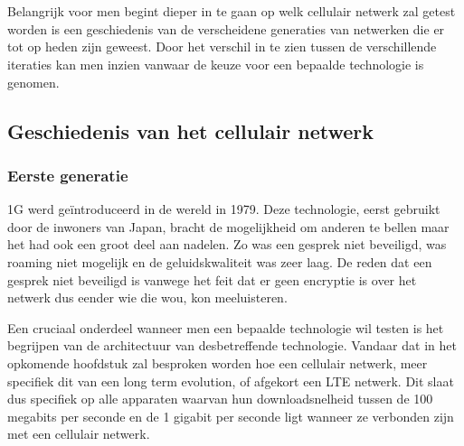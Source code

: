 \chapter{}%
\label{ch:stand-van-zaken}



Belangrijk voor men begint dieper in te gaan op welk cellulair netwerk zal getest worden is een geschiedenis van de verscheidene generaties van netwerken die er tot op heden zijn geweest. Door het verschil in te zien tussen de verschillende iteraties kan men inzien vanwaar de keuze voor een bepaalde technologie is genomen.

\section{Geschiedenis van het cellulair netwerk}

\subsection{Eerste generatie}

1G werd geïntroduceerd in de wereld in 1979. Deze technologie, eerst gebruikt door de inwoners van Japan, bracht de mogelijkheid om anderen te bellen maar het had ook een groot deel aan nadelen. Zo was een gesprek niet beveiligd, was roaming niet mogelijk en de geluidskwaliteit was zeer laag.
De reden dat een gesprek niet beveiligd is vanwege het feit dat er geen encryptie is over het netwerk dus eender wie die wou, kon meeluisteren.  \autocite{Galazzo2020} \\

\pagebreak

Een cruciaal onderdeel wanneer men een bepaalde technologie wil testen is het begrijpen van de architectuur van desbetreffende technologie. Vandaar dat in het opkomende hoofdstuk zal besproken worden hoe een cellulair netwerk, meer specifiek dit van een long term evolution, of afgekort een LTE netwerk. Dit slaat dus specifiek op alle apparaten waarvan hun downloadsnelheid tussen de 100 megabits per seconde en de 1 gigabit per seconde ligt wanneer ze verbonden zijn met een cellulair netwerk. \autocite{Volle2024}

